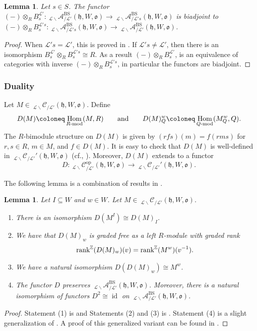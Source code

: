 \documentclass{amsart}
\newcommand{\Z}{\mathbb{Z}}
\newcommand{\scrL}{\mathcal{L}}
\DeclareMathOperator{\Hom}{Hom}
\renewcommand{\mod}[1]{#1\textnormal{-mod}}
\DeclareMathOperator{\id}{id}
\newcommand{\fr}[1]{\mathfrak{#1}}
\DeclareMathOperator{\op}{op}
\DeclareMathOperator{\BS}{BS}
\newcommand{\Cmon}[2]{\:_{#1 \backslash} \mathcal{C}_{/ #2} }
\newcommand{\Amon}[2]{\:_{#1 \backslash} \mathcal{A}_{/ #2} }
\newcommand{\grk}{\textnormal{rank}^{\Z}}
\newtheorem{lemma}[subsubsection]{Lemma}
\theoremstyle{definition}
\numberwithin{equation}{subsection}
\begin{document}
\begin{lemma}\label{lem:BS_tensor_adjunction}
    Let $s \in S$. The functor $(-) \otimes_R B_s^{\scrL'} : \Amon{\scrL}{\scrL'}^{\BS} (\fr{h}, W, \fr{o}) \to \Amon{\scrL}{\scrL' s}^{\BS} (\fr{h}, W, \fr{o})$ is biadjoint to $(-) \otimes_R B_s^{\scrL' s} : \Amon{\scrL}{\scrL' s}^{\BS} (\fr{h}, W, \fr{o}) \to \Amon{\scrL}{\scrL'}^{\BS} (\fr{h}, W, \fr{o})$.
\end{lemma}
\begin{proof}
    When $\scrL' s = \scrL'$, this is proved in \cite[Lemma 2.15]{Abe19}.
    If $\scrL' s \neq \scrL'$, then there is an isomorphism $B_s^{\scrL'} \otimes_R B_s^{\scrL' s} \cong R$.
    As a result $(-) \otimes_R B_s^{\scrL'}$, is an equivalence of categories with inverse $(-) \otimes_R B_s^{\scrL' s}$, in particular the functors are biadjoint.
\end{proof}

\subsubsection{Duality}

Let $M \in \Cmon{\scrL}{\scrL'} (\fr{h}, W, \fr{o})$. Define
\[ D(M) \coloneq \Hom_{\mod{R}} (M, R) \qquad\text{and}\qquad D(M)_Q^w \coloneq \Hom_{\mod{Q}} (M_Q^w, Q).\]
The $R$-bimodule structure on $D(M)$ is given by $(rfs) (m) = f(rms)$ for $r,s \in R$, $m \in M$, and $f \in D(M)$.
It is easy to check that $D(M)$ is well-defined in $\Cmon{\scrL}{\scrL'}' (\fr{h}, W, \fr{o})$ (cf., \cite[\S2.6]{Abe19}).
Moreover, $D(M)$ extends to a functor
\[D : \Cmon{\scrL}{\scrL'}^{\op} (\fr{h}, W, \fr{o}) \to \Cmon{\scrL}{\scrL'}' (\fr{h}, W, \fr{o}).\]

The following lemma is a combination of results in \cite[\S2.6]{Abe19}.
\begin{lemma}\label{lem:dual_and_invs} 
    Let $I \subseteq W$ and $w \in W$. Let $M \in \Cmon{\scrL}{\scrL'} (\fr{h}, W, \fr{o})$.
    \begin{enumerate}
        \item There is an isomorphism $D (M^I) \cong D(M)_I$.
        \item We have that $D(M)_w$ is graded free as a left $R$-module with graded rank 
        \[ \grk (D(M)_w) (v) = \grk (M^w) (v^{-1}). \]
        \item We have a natural isomorphism $D (D(M)_w) \cong M^w$.
        \item The functor $D$ preserves $\Amon{\scrL}{\scrL'}^{\BS} (\fr{h}, W, \fr{o})$. Moreover, there is a natural isomorphism of functors $D^2 \cong \id$ on $\Amon{\scrL}{\scrL'}^{\BS} (\fr{h}, W, \fr{o})$.
    \end{enumerate}
\end{lemma}
\begin{proof}
    Statement (1) is \cite[Lemma 2.18]{Abe19} and Statements (2) and (3) is \cite[Lemma 2.19]{Abe19}. Statement (4) is a slight generalization of \cite[Lemma 2.20]{Abe19}. A proof of this generalized variant can be found in \cite[Proposition 2.11]{Masaharu}.
\end{proof}
\end{document}
